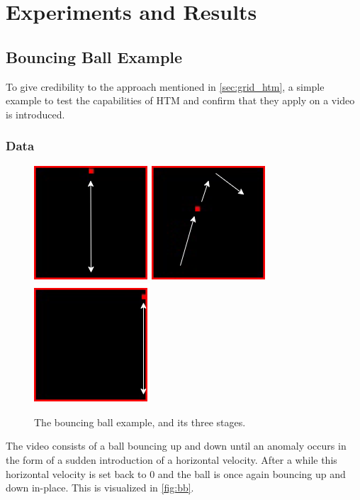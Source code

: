 \chapter{Experiments and Results}
\label{sec:experiments}
\section{Bouncing Ball Example}
To give credibility to the approach mentioned in \autoref{sec:grid_htm}, a simple example to test the capabilities of HTM and confirm that they apply on a video is introduced.
\subsection{Data}
\begin{figure}[H]
    \centering
    \includegraphics[width=.3\textwidth]{resources/experiments/bouncing_ball/bb_updown1.png}\hfill
    \includegraphics[width=.3\textwidth]{resources/experiments/bouncing_ball/bb_updownside.png}\hfill
    \includegraphics[width=.3\textwidth]{resources/experiments/bouncing_ball/bb_updown2.png}
    \caption{The bouncing ball example, and its three stages.}
    \label{fig:bb}
\end{figure}
The video consists of a ball bouncing up and down until an anomaly occurs in the form of a sudden introduction of a horizontal velocity. After a while this horizontal velocity is set back to 0 and the ball is once again bouncing up and down in-place. This is visualized in \autoref{fig:bb}.
\par

